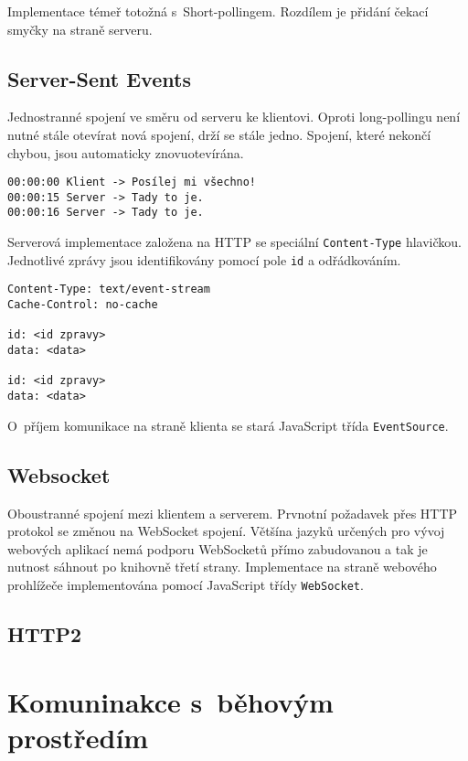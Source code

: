 Implementace témeř totožná s~Short-pollingem.
Rozdílem je přidání čekací smyčky na straně serveru.

\subsection{Server-Sent Events}

Jednostranné spojení ve směru od serveru ke klientovi.
Oproti long-pollingu není nutné stále otevírat nová spojení, drží se stále jedno.
Spojení, které nekončí chybou, jsou automaticky znovuotevírána.

\begin{verbatim}
00:00:00 Klient -> Posílej mi všechno!
00:00:15 Server -> Tady to je.
00:00:16 Server -> Tady to je.
\end{verbatim}

\noindent
Serverová implementace založena na HTTP se speciální \verb|Content-Type| hlavičkou.
Jednotlivé zprávy jsou identifikovány pomocí pole \verb|id| a odřádkováním.

\begin{verbatim}
Content-Type: text/event-stream
Cache-Control: no-cache

id: <id zpravy>
data: <data>

id: <id zpravy>
data: <data>
\end{verbatim}

O~příjem komunikace na straně klienta se stará JavaScript třída \verb|EventSource|.

\subsection{Websocket}

Oboustranné spojení mezi klientem a serverem.
Prvnotní požadavek přes HTTP protokol se změnou na WebSocket spojení.
Většína jazyků určených pro vývoj webových aplikací nemá podporu WebSocketů přímo zabudovanou a tak je nutnost sáhnout po knihovně třetí strany.
Implementace na straně webového prohlížeče implementována pomocí JavaScript třídy \verb|WebSocket|.


\subsection{HTTP2}


\section{Komuninakce s~běhovým prostředím}


